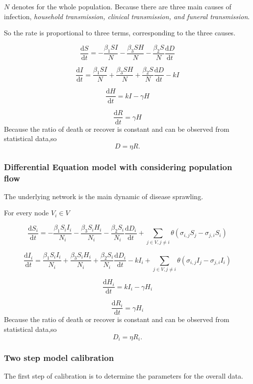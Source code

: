 \documentclass[12pt]{article}
\begin{document}
$N$ denotes for the whole population. Because there are three main causes of infection, \emph{household transmission, clinical transmission, and funeral transmission}.

So the rate is proportional to three terms, corresponding to the three causes.

$$\frac{\mathrm{d}S}{\mathrm{d}t} = -\frac{\beta_1 S I}{N}-\frac{\beta_3 S H}{N}  - \frac{\beta_2 S }{N} \frac{\mathrm{d}D}{\mathrm{d}t} $$ 


$$\frac{\mathrm{d}I}{\mathrm{d}t} = \frac{\beta_1 S I}{N} +\frac{\beta_3 S H}{N}  + \frac{\beta_2 S }{N} \frac{\mathrm{d}D}{\mathrm{d}t} - kI$$ 

$$\frac{\mathrm{d}H}{\mathrm{d}t} = kI - \gamma H$$

$$\frac{\mathrm{d}R}{\mathrm{d}t} = \gamma H$$
Because the ratio of death or recover is constant and can be observed from statistical data,so 
$$D =\eta R. $$

\subsubsection{Differential Equation model with considering population flow}

The underlying network is the main dynamic of disease sprawling. 

For every node $V_i \in V$

$$\frac{\mathrm{d}S_i}{\mathrm{d}t} = -\frac{\beta_1 S_i I_i}{N_i}-\frac{\beta_3 S_i H_i}{N_i}  - \frac{\beta_2 S_i }{N_i} \frac{\mathrm{d}D_i}{\mathrm{d}t} + \sum_{j\in V,j\neq i} \theta(\sigma_{i,j} S_j - \sigma_{j,i} S_i) $$ 


$$\frac{\mathrm{d}I_i}{\mathrm{d}t} = \frac{\beta_1 S_i I_i}{N_i} +\frac{\beta_3 S_i H_i}{N_i}  + \frac{\beta_2 S_i }{N_i} \frac{\mathrm{d}D_i}{\mathrm{d}t} - kI_i + \sum_{j\in V,j\neq i} \theta(\sigma_{i,j} I_j - \sigma_{j,i} I_i)$$ 

$$\frac{\mathrm{d}H_i}{\mathrm{d}t} = kI_i - \gamma H_i$$

$$\frac{\mathrm{d}R_i}{\mathrm{d}t} = \gamma H_i$$
Because the ratio of death or recover is constant and can be observed from statistical data,so 
$$D_i =\eta R_i. $$




\subsubsection{Two step model calibration}
The first step of calibration is to determine the parameters for the overall data.
\end{document}
